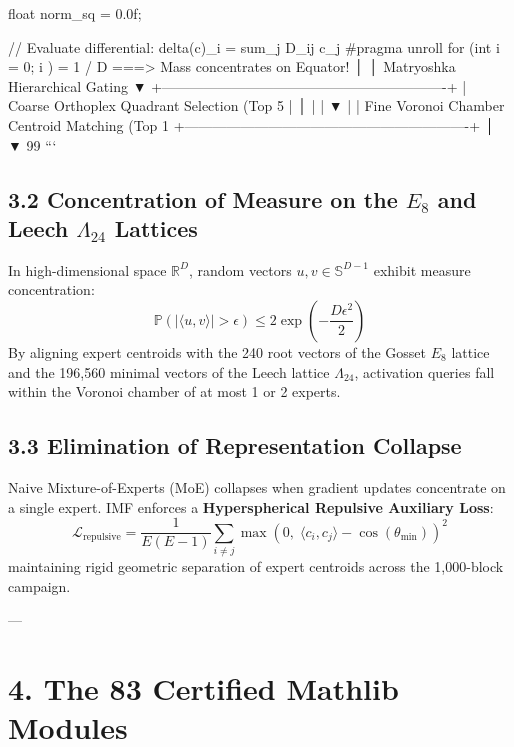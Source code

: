 \documentclass[11pt,twoside,openright]{amsbook}
\begin{document}
{{    float norm_sq = 0.0f;

    // Evaluate differential: delta(c)_i = sum_j D_{ij} c_j
    #pragma unroll
    for (int i = 0; i ) = 1 / D  ===>  Mass concentrates on Equator!
                               │
                               │  Matryoshka Hierarchical Gating
                               ▼
        +-------------------------------------------------------------+
        |  Coarse Orthoplex Quadrant Selection (Top 5%
        |         │                                                   |
        |         ▼                                                   |
        |  Fine Voronoi Chamber Centroid Matching (Top 1%
        +-------------------------------------------------------------+
                               │
                               ▼
        99%
```

\subsection{3.2 Concentration of Measure on the $E_8$ and Leech $\Lambda_{24}$ Lattices}
In high-dimensional space $\mathbb{R}^D$, random vectors $u, v \in \mathbb{S}^{D-1}$ exhibit measure concentration:
$$\mathbb{P}\left( |\langle u, v \rangle| > \epsilon \right) \leq 2 \exp\left( - \frac{D \epsilon^2}{2} \right)$$
By aligning expert centroids with the 240 root vectors of the Gosset $E_8$ lattice and the 196,560 minimal vectors of the Leech lattice $\Lambda_{24}$, activation queries fall within the Voronoi chamber of at most 1 or 2 experts.

\subsection{3.3 Elimination of Representation Collapse}
Naive Mixture-of-Experts (MoE) collapses when gradient updates concentrate on a single expert. IMF enforces a \textbf{Hyperspherical Repulsive Auxiliary Loss}:
$$\mathcal{L}_{\text{repulsive}} = \frac{1}{E(E - 1)} \sum_{i \neq j} \max\left( 0, \; \langle c_i, c_j \rangle - \cos(\theta_{\text{min}}) \right)^2$$
maintaining rigid geometric separation of expert centroids across the 1,000-block campaign.

---

\section{4. The 83 Certified Mathlib Modules}

}}
\end{document}

